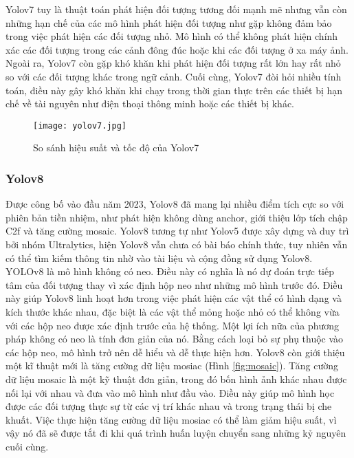 \documentclass[../the.tex]{subfiles}
\begin{document}
\bigskip

{\fontsize{13}{12} \selectfont
	Yolov7 tuy là thuật toán phát hiện đối tượng tương đối mạnh mẽ nhưng vẫn còn những hạn chế của các mô hình phát hiện đối tượng như gặp không đảm bảo trong việc phát hiện các đối tượng nhỏ. Mô hình có thể không phát hiện chính xác các đối tượng trong các cảnh đông đúc hoặc khi các đối tượng ở xa máy ảnh.
	Ngoài ra, Yolov7 còn gặp khó khăn khi phát hiện đối tượng rất lớn hay rất nhỏ so với các đối tượng khác trong ngữ cảnh. Cuối cùng, Yolov7 đòi hỏi nhiều tính toán, điều này gây khó khăn khi chạy trong thời gian thực trên các thiết bị hạn chế về tài nguyên như điện thoại thông minh hoặc các thiết bị
	khác.
}

\begin{figure}[H]
	\centering
	\texttt{[image: yolov7.jpg]}
	\caption{So sánh hiệu suất và tốc độ của Yolov7 \cite{wang2022yolov7}}
	\label{fig:yolov7}
\end{figure}

\subsubsection{Yolov8}
\label{sec:yolov8}
{\fontsize{13}{12} \selectfont
	Được công bố vào đầu năm 2023, Yolov8 đã mang lại nhiều điểm tích cực so với phiên bản tiền nhiệm, như phát hiện không dùng anchor, giới thiệu lớp tích chập C2f và tăng cường mosaic.
	Yolov8 tương tự như Yolov5 được xây dựng và duy trì bởi nhóm Ultralytics, hiện Yolov8 vẫn chưa có bài báo chính thức, tuy nhiên vẫn có thể tìm kiếm thông tin nhờ vào tài liệu và cộng đồng sử dụng Yolov8.
	YOLOv8 là mô hình không có neo. Điều này có nghĩa là nó dự đoán trực tiếp tâm của đối tượng thay vì xác định hộp neo như những mô hình trước đó.
	Điều này giúp Yolov8 linh hoạt hơn trong việc phát hiện các vật thể có hình dạng và kích thước khác nhau, đặc biệt là các vật thể mỏng hoặc nhỏ có thể không vừa với các hộp neo được xác định trước của hệ thống.
	Một lợi ích nữa của phương pháp không có neo là tính đơn giản của nó. Bằng cách loại bỏ sự phụ thuộc vào các hộp neo, mô hình trở nên dễ hiểu và dễ thực hiện hơn.
	Yolov8 còn giới thiệu một kĩ thuật mới là tăng cường dữ liệu mosiac (Hình \ref{fig:mosaic}). Tăng cường dữ liệu mosaic là một kỹ thuật đơn giản, trong đó bốn hình ảnh khác nhau được nối lại với nhau và đưa vào mô hình như đầu vào. Điều này giúp mô hình học được các đối tượng thực sự từ các vị trí khác nhau và trong trạng thái bị che khuất.
	Việc thực hiện tăng cường dữ liệu mosiac có thể làm giảm hiệu suất, vì vậy nó đã sẽ được tắt đi khi quá trình huấn luyện chuyển sang những kỷ nguyên cuối cùng.
}
\end{document}
